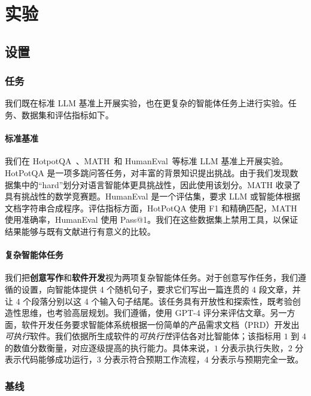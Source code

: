 \section{实验}

\subsection{设置}

\subsubsection{任务}
我们既在标准 LLM 基准上开展实验，也在更复杂的智能体任务上进行实验。任务、数据集和评估指标如下。



\paragraph{标准基准}
我们在 HotpotQA~\citep{yang-etal-2018-hotpotqa}、MATH~\citep{hendrycksmath2021}和 HumanEval~\citep{chen2021codex}等标准 LLM 基准上开展实验。HotPotQA 是一项多跳问答任务，对丰富的背景知识提出挑战。由于我们发现数据集中的“hard”划分对语言智能体更具挑战性，因此使用该划分。MATH 收录了具有挑战性的数学竞赛题。HumanEval 是一个评估集，要求 LLM 或智能体根据文档字符串合成程序。评估指标方面，HotPotQA 使用 F1 和精确匹配，MATH 使用准确率，HumanEval 使用 Pass@1。我们在这些数据集上禁用工具，以保证结果能够与既有文献进行有意义的比较。

\paragraph{复杂智能体任务}
我们把\textbf{创意写作}和\textbf{软件开发}视为两项复杂智能体任务。对于创意写作任务，我们遵循\citet{yao2023tree}的设置，向智能体提供 4 个随机句子，要求它们写出一篇连贯的 4 段文章，并让 4 个段落分别以这 4 个输入句子结尾。该任务具有开放性和探索性，既考验创造性思维，也考验高层规划。我们遵循\citet{yao2023tree}，使用 GPT-4 评分来评估文章。另一方面，软件开发任务要求智能体系统根据一份简单的产品需求文档（PRD）开发出\textit{可执行}软件。我们依据所生成软件的\textit{可执行性}评估各对比智能体；该指标用 $1$ 到 $4$ 的数值分数衡量，对应逐级提高的执行能力。具体来说，$1$ 分表示执行失败，$2$ 分表示代码能够成功运行，$3$ 分表示符合预期工作流程，$4$ 分表示与预期完全一致。

\subsubsection{基线}

